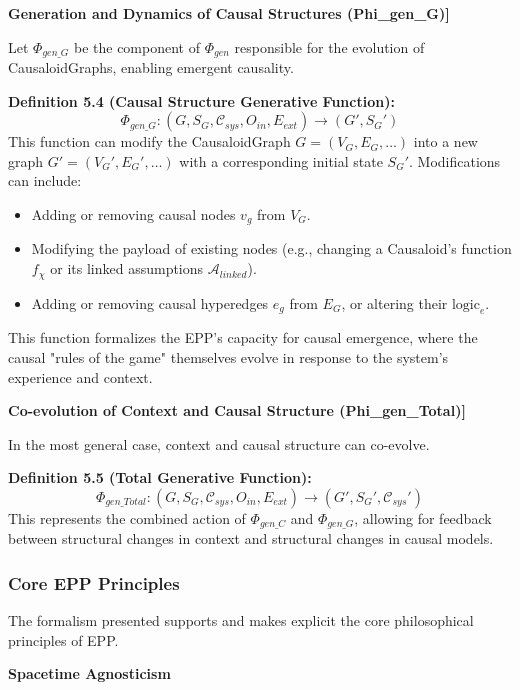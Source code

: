 \textbf{Generation and Dynamics of Causal Structures (Phi\_gen\_G)]}


Let \(\Phi_{gen\_G}\) be the component of \(\Phi_{gen}\) responsible for the evolution of CausaloidGraphs, enabling emergent causality.

\textbf{Definition 5.4 (Causal Structure Generative Function):}
\[ \Phi_{gen\_G} : (G, S_G, \mathcal{C}_{sys}, O_{in}, E_{ext}) \to (G', S_G') \]
This function can modify the CausaloidGraph \(G=(V_G, E_G, \dots)\) into a new graph \(G'=(V_G', E_G', \dots)\) with a corresponding initial state \(S_G'\). Modifications can include:
\begin{itemize}
    \item Adding or removing causal nodes \(v_g\) from \(V_G\).
    \item Modifying the payload of existing nodes (e.g., changing a Causaloid's function \(f_\chi\) or its linked assumptions \(\mathcal{A}_{linked}\)).
    \item Adding or removing causal hyperedges \(e_g\) from \(E_G\), or altering their \(\text{logic}_e\).
\end{itemize}
This function formalizes the EPP's capacity for causal emergence, where the causal "rules of the game" themselves evolve in response to the system's experience and context.


\textbf{Co-evolution of Context and Causal Structure (Phi\_gen\_Total)]}

In the most general case, context and causal structure can co-evolve.

\textbf{Definition 5.5 (Total Generative Function):}
\[ \Phi_{gen\_Total} : (G, S_G, \mathcal{C}_{sys}, O_{in}, E_{ext}) \to (G', S_G', \mathcal{C}_{sys}') \]
This represents the combined action of \(\Phi_{gen\_C}\) and \(\Phi_{gen\_G}\), allowing for feedback between structural changes in context and structural changes in causal models.

\subsubsection[Core EPP Principles]{Core EPP Principles}
\label{ssec:epp_principles_formal_merged} %

The formalism presented supports and makes explicit the core philosophical principles of EPP.

\textbf{Spacetime Agnosticism}


